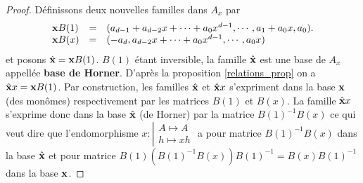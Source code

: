 \documentclass{standalone}
\begin{document}
\begin{proof}
Définissons deux nouvelles familles dans $A_x$ par
\begin{equation}
	\begin{array}{lll}
		\bold{x}B(1) & = & (a_{d-1} + a_{d-2}x + \cdots + a_0x^{d-1}, \cdots, a_1 + a_0x,  a_0).\\
		\bold{x}B(x) & = & (-a_d, a_{d-2}x + \cdots + a_0x^{d-1}, \cdots, a_0x)
	\end{array}
\end{equation}
et posons $\hat{\bold{x}} = \bold{x}B(1)$.
$B(1)$ étant inversible, la famille $\hat{\bold{x}}$ est une base de $A_x$ appellée {\bf base de Horner}.
D'après la proposition \ref{relations_prop} on a $\hat{\bold{x}}x = \bold{x}B(1)$. Par construction, les familles $\hat{\bold{x}}$ et $\hat{\bold{x}}x$ s'expriment dans la base $\bold{x}$ (des monômes) respectivement par les matrices $B(1)$ et $B(x)$.
La famille $\hat{\bold{x}}x$ s'exprime donc dans la base $\hat{\bold{x}}$ (de Horner) par la matrice $B(1)^{-1}B(x)$ ce qui veut dire que l'endomorphisme
$x : \left\vert
\begin{array}{c}
A \mapsto A \\
h \mapsto xh
\end{array}
\right.$ a pour matrice $B(1)^{-1}B(x)$ dans la base $\hat{\bold{x}}$
et pour matrice $B(1)(B(1)^{-1}B(x))B(1)^{-1} = B(x)B(1)^{-1}$ dans la base $\bold{x}$.
\end{proof}
\end{document}
